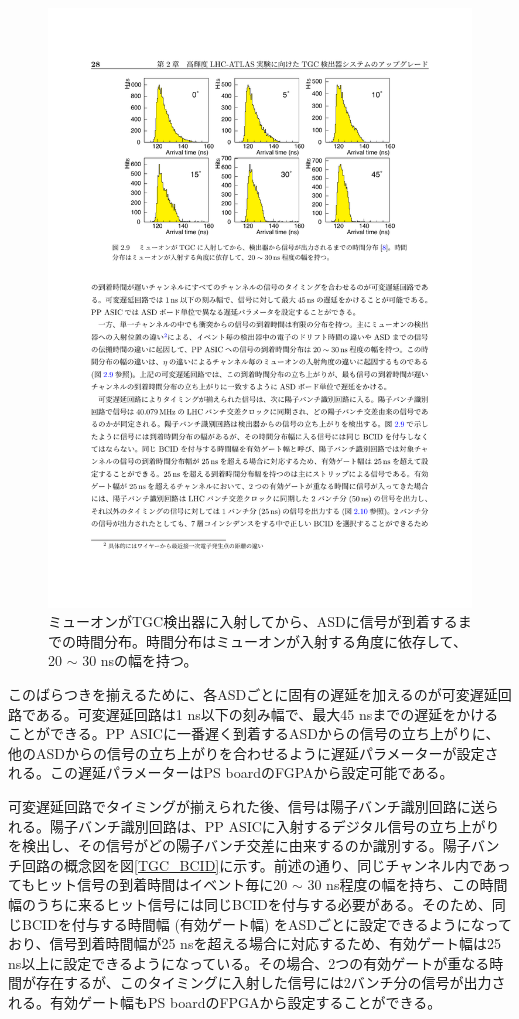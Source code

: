     \begin{figure} 
    \centering
    \includegraphics[width=16cm]{fig/Intro/TGC_fructuation.pdf}
    \caption[TGCに入射するミューオンの時間分布]{ミューオンがTGC検出器に入射してから、ASDに信号が到着するまでの時間分布\cite{TGC_fructuation}。時間分布はミューオンが入射する角度に依存して、20 $\sim$ 30 nsの幅を持つ。}
    \label{TGC_fructuation}
    \end{figure}

    このばらつきを揃えるために、各ASDごとに固有の遅延を加えるのが可変遅延回路である。可変遅延回路は1 ns以下の刻み幅で、最大45 nsまでの遅延をかけることができる。PP ASICに一番遅く到着するASDからの信号の立ち上がりに、他のASDからの信号の立ち上がりを合わせるように遅延パラメーターが設定される。この遅延パラメーターはPS boardのFGPAから設定可能である。

    可変遅延回路でタイミングが揃えられた後、信号は陽子バンチ識別回路に送られる。陽子バンチ識別回路は、PP ASICに入射するデジタル信号の立ち上がりを検出し、その信号がどの陽子バンチ交差に由来するのか識別する。陽子バンチ回路の概念図を図\ref{TGC_BCID}に示す。前述の通り、同じチャンネル内であってもヒット信号の到着時間はイベント毎に20 $\sim$ 30 ns程度の幅を持ち、この時間幅のうちに来るヒット信号には同じBCIDを付与する必要がある。そのため、同じBCIDを付与する時間幅 (有効ゲート幅) をASDごとに設定できるようになっており、信号到着時間幅が25 nsを超える場合に対応するため、有効ゲート幅は25 ns以上に設定できるようになっている。その場合、2つの有効ゲートが重なる時間が存在するが、このタイミングに入射した信号には2バンチ分の信号が出力される。有効ゲート幅もPS boardのFPGAから設定することができる。

